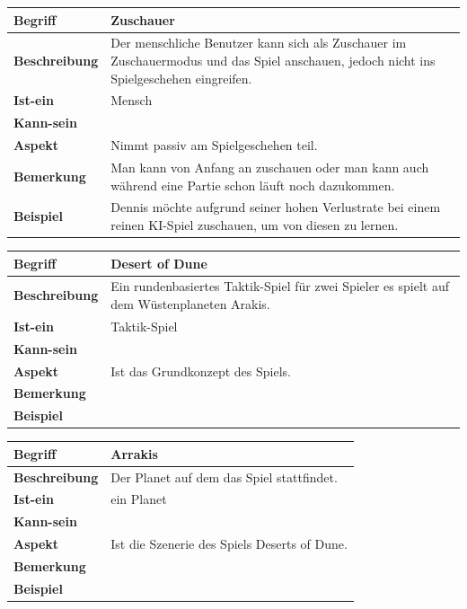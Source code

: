 \documentclass[12pt]{article}
\newcounter{fa}
\newcounter{nfa}
\begin{document}
\begin{tabularx}{16cm}{|l|X|}
\hline
\textbf{Begriff} & \textbf{Zuschauer} \\
\hline
\textbf{Beschreibung} & Der menschliche Benutzer kann sich als Zuschauer im Zuschauermodus und das Spiel anschauen, jedoch nicht ins Spielgeschehen eingreifen. \\
\hline
\textbf{Ist-ein} & Mensch\\
\hline
\textbf{Kann-sein} & \\
\hline
\textbf{Aspekt} & Nimmt passiv am Spielgeschehen teil.\\
\hline
\textbf{Bemerkung} & Man kann von Anfang an zuschauen oder man kann auch während eine Partie schon läuft noch dazukommen.\\
\hline
\textbf{Beispiel} &  Dennis möchte aufgrund seiner hohen Verlustrate bei einem reinen KI-Spiel zuschauen, um von diesen zu lernen. \\
\hline
\end{tabularx}

\begin{tabularx}{16cm}{|l|X|}
\hline
\textbf{Begriff} & \textbf{Desert of Dune} \\
\hline
\textbf{Beschreibung} & Ein rundenbasiertes Taktik-Spiel für zwei Spieler es spielt auf dem Wüstenplaneten Arakis. \\
\hline
\textbf{Ist-ein} & Taktik-Spiel\\
\hline
\textbf{Kann-sein} & \\
\hline
\textbf{Aspekt} & Ist das Grundkonzept des Spiels. \\
\hline
\textbf{Bemerkung} & \\
\hline
\textbf{Beispiel} &  \\
\hline
\end{tabularx}

\begin{tabularx}{16cm}{|l|X|}
\hline
\textbf{Begriff} & \textbf{Arrakis} \\
\hline
\textbf{Beschreibung} & Der Planet auf dem das Spiel stattfindet.\\
\hline
\textbf{Ist-ein} & ein Planet\\
\hline
\textbf{Kann-sein} & \\
\hline
\textbf{Aspekt} & Ist die Szenerie des Spiels Deserts of Dune. \\
\hline
\textbf{Bemerkung} & \\
\hline
\textbf{Beispiel} &  \\
\hline
\end{tabularx}
\end{document}
